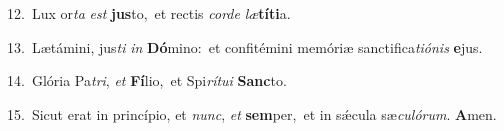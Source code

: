 {\numbfont\textcolor{\numbcolor}{12.}}~Lux or\textit{ta} \textit{est} \textbf{jus}\-to,~\star et rectis \textit{cor}\-\textit{de} \textit{læ}\-\textbf{tí}\textbf{ti}a.\par
{\numbfont\textcolor{\numbcolor}{13.}}~Lætámini, jus\textit{ti} \textit{in} \textbf{Dó}\-mino:~\star et confitémini memóriæ sanctifica\-\textit{ti}\-\textit{ó}\textit{nis} \textbf{e}\-jus.\par
{\numbfont\textcolor{\numbcolor}{14.}}~Glória Pa\-\textit{tri}\-, \textit{et} \textbf{Fí}\-lio,~\star et Spi\-\textit{rí}\-\textit{tu}\textit{i} \textbf{Sanc}\-to.\par
{\numbfont\textcolor{\numbcolor}{15.}}~Sicut erat in princípio, et \textit{nunc}\-, \textit{et} \textbf{sem}\-per,~\star et in sǽcula sæ\-\textit{cu}\-\textit{ló}\textit{rum}. \textbf{A}\-men.\par
